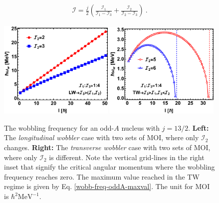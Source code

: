 \begin{align}
    \mathscr{I}=\frac{j}{2}\left(\frac{\mathcal{I}_1}{\mathcal{I}_1-\mathcal{I}_3}+\frac{\mathcal{I}_2}{\mathcal{I}_2-\mathcal{I}_3}\right)\ .
    \label{wobb-freq-oddA-maxval}
\end{align}
\begin{figure}
    \centering
    \includegraphics[width=0.49\textwidth]{Chapters/Figures/wobb_freq_oddA-LW.pdf}
    \includegraphics[width=0.49\textwidth]{Chapters/Figures/wobb_freq_oddA-TW.pdf}
    \caption{The wobbling frequency for an odd-$A$ nucleus with $j=13/2$. \textbf{Left:} The \emph{longitudinal wobbler} case with two sets of MOI, where only $\mathcal{I}_2$ changes. \textbf{Right:} The \emph{transverse wobbler} case with two sets of MOI, where only $\mathcal{I}_2$ is different. Note the vertical grid-lines in the right inset that signify the critical angular momentum where the wobbling frequency reaches zero. The maximum value reached in the TW regime is given by Eq. \ref{wobb-freq-oddA-maxval}. The unit for MOI is $\hbar^2\text{MeV}^{-1}$.}
    \label{wobbling-freq-oddA}
\end{figure}

